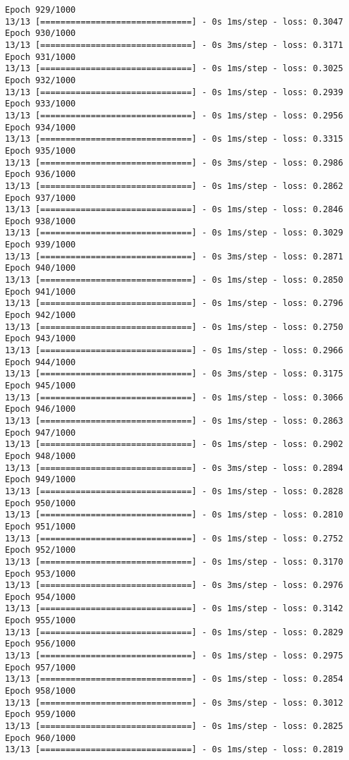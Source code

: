 \documentclass[11pt]{article}
\begin{document}
\begin{Verbatim}[commandchars=\\\{\}]
Epoch 929/1000
13/13 [==============================] - 0s 1ms/step - loss: 0.3047
Epoch 930/1000
13/13 [==============================] - 0s 3ms/step - loss: 0.3171
Epoch 931/1000
13/13 [==============================] - 0s 1ms/step - loss: 0.3025
Epoch 932/1000
13/13 [==============================] - 0s 1ms/step - loss: 0.2939
Epoch 933/1000
13/13 [==============================] - 0s 1ms/step - loss: 0.2956
Epoch 934/1000
13/13 [==============================] - 0s 1ms/step - loss: 0.3315
Epoch 935/1000
13/13 [==============================] - 0s 3ms/step - loss: 0.2986
Epoch 936/1000
13/13 [==============================] - 0s 1ms/step - loss: 0.2862
Epoch 937/1000
13/13 [==============================] - 0s 1ms/step - loss: 0.2846
Epoch 938/1000
13/13 [==============================] - 0s 1ms/step - loss: 0.3029
Epoch 939/1000
13/13 [==============================] - 0s 3ms/step - loss: 0.2871
Epoch 940/1000
13/13 [==============================] - 0s 1ms/step - loss: 0.2850
Epoch 941/1000
13/13 [==============================] - 0s 1ms/step - loss: 0.2796
Epoch 942/1000
13/13 [==============================] - 0s 1ms/step - loss: 0.2750
Epoch 943/1000
13/13 [==============================] - 0s 1ms/step - loss: 0.2966
Epoch 944/1000
13/13 [==============================] - 0s 3ms/step - loss: 0.3175
Epoch 945/1000
13/13 [==============================] - 0s 1ms/step - loss: 0.3066
Epoch 946/1000
13/13 [==============================] - 0s 1ms/step - loss: 0.2863
Epoch 947/1000
13/13 [==============================] - 0s 1ms/step - loss: 0.2902
Epoch 948/1000
13/13 [==============================] - 0s 3ms/step - loss: 0.2894
Epoch 949/1000
13/13 [==============================] - 0s 1ms/step - loss: 0.2828
Epoch 950/1000
13/13 [==============================] - 0s 1ms/step - loss: 0.2810
Epoch 951/1000
13/13 [==============================] - 0s 1ms/step - loss: 0.2752
Epoch 952/1000
13/13 [==============================] - 0s 1ms/step - loss: 0.3170
Epoch 953/1000
13/13 [==============================] - 0s 3ms/step - loss: 0.2976
Epoch 954/1000
13/13 [==============================] - 0s 1ms/step - loss: 0.3142
Epoch 955/1000
13/13 [==============================] - 0s 1ms/step - loss: 0.2829
Epoch 956/1000
13/13 [==============================] - 0s 1ms/step - loss: 0.2975
Epoch 957/1000
13/13 [==============================] - 0s 1ms/step - loss: 0.2854
Epoch 958/1000
13/13 [==============================] - 0s 3ms/step - loss: 0.3012
Epoch 959/1000
13/13 [==============================] - 0s 1ms/step - loss: 0.2825
Epoch 960/1000
13/13 [==============================] - 0s 1ms/step - loss: 0.2819

\end{Verbatim}
\end{document}
